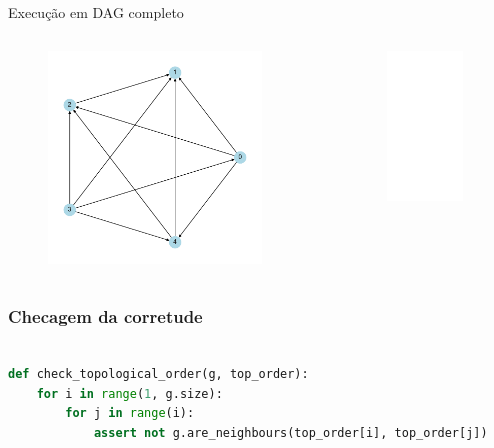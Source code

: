 \documentclass[aspectratio=169,usenames,dvipsnames]{beamer}
\begin{document}
\begin{frame}{Execução em DAG completo}

  \begin{columns}[t]
  \begin{figure}[ht]
  \centering
  \includegraphics[width=0.9\textwidth]{figs/dag_complete_5.pdf}
  \end{figure}
  \vfill
  \begin{figure}[ht]
  \centering
  \includegraphics<2>[width=0.9\textwidth]{figs/dag_complete_top_5.pdf}
  \end{figure}
  \vfill
  \end{columns}
  
\end{frame}

\begin{frame}[fragile]  %
  \frametitle{Checagem da corretude}

      \begin{lstlisting}[language=Python, basicstyle=\ttfamily\small]

def check_topological_order(g, top_order):
    for i in range(1, g.size):
        for j in range(i):
            assert not g.are_neighbours(top_order[i], top_order[j])

      \end{lstlisting}

\end{frame}
\end{document}
